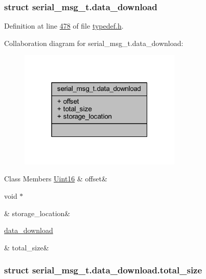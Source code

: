 \subsubsection{struct serial\+\_\+msg\+\_\+t.\+data\+\_\+download}


Definition at line \hyperlink{a00001_source_l00478}{478} of file \hyperlink{a00001_source}{typedef.\+h}.



Collaboration diagram for serial\+\_\+msg\+\_\+t.\+data\+\_\+download\+:
\nopagebreak
\begin{figure}[H]
\begin{center}
\leavevmode
\includegraphics[width=220pt]{dd/d86/a00271}
\end{center}
\end{figure}
\begin{DoxyFields}{Class Members}
\hypertarget{a00001_a7a86c157ee9713c34fbd7a1ee40f0c5a}{\hyperlink{a00001_aae7407b021d43f7193a81a58cfb3e297}{Uint16}}\label{a00001_a7a86c157ee9713c34fbd7a1ee40f0c5a}
&
offset&
\\
\hline

\hypertarget{a00001_a03b67cde4ca3765748e710bd341c38da}{void $\ast$}\label{a00001_a03b67cde4ca3765748e710bd341c38da}
&
storage\+\_\+location&
\\
\hline

\hypertarget{a00001_a2cd6b347ff013dd494370a9938344885}{\hyperlink{a00001_da/d72/a00124}{data\+\_\+download}}\label{a00001_a2cd6b347ff013dd494370a9938344885}
&
total\+\_\+size&
\\
\hline

\end{DoxyFields}
\label{da/d72/a00124}
\hypertarget{a00001_da/d72/a00124}{}
\subsubsection{struct serial\+\_\+msg\+\_\+t.\+data\+\_\+download.\+total\+\_\+size}


